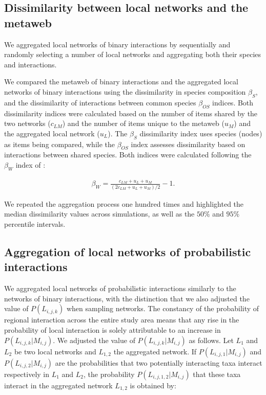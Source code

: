 \begin{refsection}
\subsection{Dissimilarity between local networks and the metaweb}

We aggregated local networks of binary interactions by sequentially and randomly
selecting a number of local networks and aggregating both their species and
interactions. 

We compared the metaweb of binary interactions and the aggregated local networks
of binary interactions using the dissimilarity in species composition
$\beta_{S}$, and the dissimilarity of interactions between common species
$\beta_{OS}$ indices. Both dissimilarity indices were calculated based on the
number of items shared by the two networks ($c_{LM}$) and the number of items
unique to the metaweb ($u_M$) and the aggregated local network ($u_L$). The
$\beta_{S}$ dissimilarity index uses species (nodes) as items being compared,
while the $\beta_{OS}$ index assesses dissimilarity based on interactions
between shared species. Both indices were calculated following the $\beta_W$
index of \textcite{Whittaker1960Vegetation}: 

\begin{eqnarray}
    \label{eq:betadiv_network}
    \beta_W = \frac{c_{LM} + u_L + u_M}{(2 c_{LM} + u_L + u_M) / 2} - 1.
\end{eqnarray}

We repeated the aggregation process one hundred times and highlighted the median
dissimilarity values across simulations, as well as the $50\%$ and $95\%$
percentile intervals. 

\subsection{Aggregation of local networks of probabilistic interactions}

We aggregated local networks of probabilistic interactions similarly to the
networks of binary interactions, with the distinction that we also adjusted the
value of $P(L_{i, j, k})$ when sampling networks. The constancy of the
probability of regional interaction across the entire study area means that any
rise in the probability of local interaction is solely attributable to an
increase in $P(L_{i, j, k}|M_{i, j})$. We adjusted the value of $P(L_{i, j,
k}|M_{i, j})$ as follows. Let $L_1$ and $L_2$ be two local networks and
$L_{1,2}$ the aggregated network. If $P(L_{i, j, 1}|M_{i, j})$ and $P(L_{i, j,
2}|M_{i, j})$ are the probabilities that two potentially interacting taxa
interact respectively in $L_1$ and $L_2$, the probability $P(L_{i, j, 1,2}|M_{i,
j})$ that these taxa interact in the aggregated network $L_{1,2}$ is obtained
by: 


\end{refsection}
